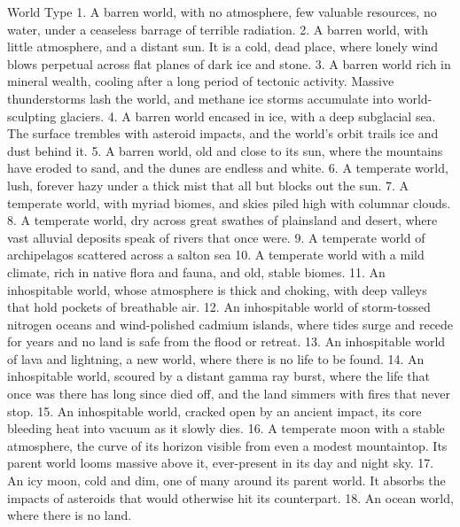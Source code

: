 World Type   
     1.  A barren world, with no atmosphere, few valuable resources, no water, under a ceaseless  
         barrage of terrible radiation.   
     2.  A barren world, with little atmosphere, and a distant sun. It is a cold, dead place, where  
         lonely wind blows perpetual across flat planes of dark ice and stone.   
     3.  A barren world rich in mineral wealth, cooling after a long period of tectonic activity.  
         Massive thunderstorms lash the world, and methane ice storms accumulate into world- 
         sculpting glaciers.  
    4.   A barren world encased in ice, with a deep subglacial sea. The surface trembles with  
         asteroid impacts, and the world’s orbit trails ice and dust behind it.   
     5.  A barren world, old and close to its sun, where the mountains have eroded to sand, and  
         the dunes are endless and white.   
     6.  A temperate world, lush, forever hazy under a thick mist that all but blocks out the sun.    
     7.  A temperate world, with myriad biomes, and skies piled high with columnar clouds.   
     8.  A temperate world, dry across great swathes of plainsland and desert, where vast alluvial  
         deposits speak of rivers that once were.   
     9.  A temperate world of archipelagos scattered across a salton sea  
     10. A temperate world with a mild climate, rich in native flora and fauna, and old, stable  
         biomes.   
     11. An inhospitable world, whose atmosphere is thick and choking, with deep valleys that hold  
         pockets of breathable air.  
     12. An inhospitable world of storm-tossed nitrogen oceans and wind-polished cadmium  
         islands, where tides surge and recede for years and no land is safe from the flood or  
         retreat.    
     13. An inhospitable world of lava and lightning, a new world, where there is no life to be found.  
     14. An inhospitable world, scoured by a distant gamma ray burst, where the life that once was  
         there has long since died off, and the land simmers with fires that never stop.   
     15. An inhospitable world, cracked open by an ancient impact, its core bleeding heat into  
         vacuum as it slowly dies.    
     16. A temperate moon with a stable atmosphere, the curve of its horizon visible from even a  
         modest mountaintop. Its parent world looms massive above it, ever-present in its day and  
         night sky.   
     17. An icy moon, cold and dim, one of many around its parent world. It absorbs the impacts of  
         asteroids that would otherwise hit its counterpart.   
     18. An ocean world, where there is no land.  

